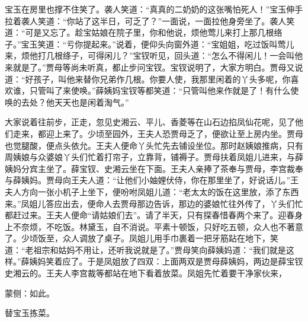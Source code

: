 \begin{parag}
    宝玉在房里也撑不住笑了。袭人笑道：“真真的二奶奶的这张嘴怕死人！”宝玉伸手拉着袭人笑道：“你站了这半日，可乏了？”一面说，一面拉他身旁坐了。袭人笑道：“可是又忘了。趁宝姑娘在院子里，你和他说，烦他莺儿来打上那几根络子。”宝玉笑道：“亏你提起来。”说着，便仰头向窗外道：“宝姐姐，吃过饭叫莺儿来，烦他打几根绦子，可得闲儿？”宝钗听见，回头道：“怎么不得闲儿！一会叫他来就是了。”贾母等尚未听真，都止步问宝钗。宝钗说明了，大家方明白。贾母又说道：“好孩子，叫他来替你兄弟作几根。你要人使，我那里闲着的丫头多呢，你喜欢谁，只管叫了来使唤。”薛姨妈宝钗等都笑道：“只管叫他来作就是了！有什么使唤的去处？他天天也是闲着淘气。”
\end{parag}


\begin{parag}
    大家说着往前步，正走，忽见史湘云、平儿、香菱等在山石边掐凤仙花呢，见了他们走来，都迎上来了。少顷至园外，王夫人恐贾母乏了，便欲让至上房内坐。贾母也觉腿酸，便点头依允。王夫人便命丫头忙先去铺设坐位。那时赵姨娘推病，只有周姨娘与众婆娘丫头们忙着打帘子，立靠背，铺褥子。贾母扶着凤姐儿进来，与薛姨妈分宾主坐了。薛宝钗、史湘云坐在下面。王夫人亲捧了茶奉与贾母，李宫裁奉与薛姨妈。贾母向王夫人道：“让他们小妯娌伏侍，你在那里坐了，好说话儿。”王夫人方向一张小机子上坐下，便吩咐凤姐儿道：“老太太的饭在这里放，添了东西来。”凤姐儿答应出去，便命人去贾母那边告诉，那边的婆娘忙往外传了，丫头们忙都赶过来。王夫人便命“请姑娘们去”。请了半天，只有探春惜春两个来了。迎春身上不奈烦，不吃饭。林黛玉，自不消说。平素十顿饭，只好吃五顿，众人也不著意了。少顷饭至，众人调放了桌子。凤姐儿用手巾裹着一把牙筋跕在地下，笑道：“老祖宗和姑妈不用让，还听我说就是了。”贾母笑向薛姨妈道：“我们就是这样。”薛姨妈笑着应了。于是凤姐放了四双：上面两双是贾母薛姨妈，两边是薛宝钗史湘云的。王夫人李宫裁等都站在地下看着放菜。凤姐先忙着要干净家伙来，\begin{note}蒙侧：如此。\end{note}替宝玉拣菜。
\end{parag}


